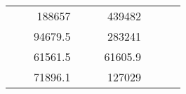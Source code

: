 \begin{table}[]
\begin{tabular}{|ccrccrccc}
\multicolumn{1}{|c|}{\cellcolor[HTML]{FFFFC7}}                                & \multicolumn{1}{c|}{\cellcolor[HTML]{DDFDFF}}                      & \multicolumn{1}{r|}{\cellcolor[HTML]{DAE8FC}188657}    & \multicolumn{1}{c|}{\cellcolor[HTML]{FFFFC7}}                                & \multicolumn{1}{c|}{\cellcolor[HTML]{DDFDFF}}                       & \multicolumn{1}{r|}{\cellcolor[HTML]{DDFDFF}439482}    &                                                                              &                                                                    &                                                        \\ \cline{3-3} \cline{6-6}
\multicolumn{1}{|c|}{\cellcolor[HTML]{FFFFC7}}                                & \multicolumn{1}{c|}{\cellcolor[HTML]{DDFDFF}}                      & \multicolumn{1}{r|}{\cellcolor[HTML]{DDFDFF}94679.5}   & \multicolumn{1}{c|}{\cellcolor[HTML]{FFFFC7}}                                & \multicolumn{1}{c|}{\cellcolor[HTML]{DDFDFF}}                       & \multicolumn{1}{r|}{\cellcolor[HTML]{DAE8FC}283241}    &                                                                              &                                                                    &                                                        \\ \cline{3-3} \cline{6-6}
\multicolumn{1}{|c|}{\cellcolor[HTML]{FFFFC7}}                                & \multicolumn{1}{c|}{\cellcolor[HTML]{DDFDFF}}                      & \multicolumn{1}{r|}{\cellcolor[HTML]{DAE8FC}61561.5}   & \multicolumn{1}{c|}{\cellcolor[HTML]{FFFFC7}}                                & \multicolumn{1}{c|}{\cellcolor[HTML]{DDFDFF}}                       & \multicolumn{1}{r|}{\cellcolor[HTML]{DDFDFF}61605.9}   &                                                                              &                                                                    &                                                        \\ \cline{3-3} \cline{6-6}
\multicolumn{1}{|c|}{\cellcolor[HTML]{FFFFC7}}                                & \multicolumn{1}{c|}{\cellcolor[HTML]{DDFDFF}}                      & \multicolumn{1}{r|}{\cellcolor[HTML]{DDFDFF}71896.1}   & \multicolumn{1}{c|}{\cellcolor[HTML]{FFFFC7}}                                & \multicolumn{1}{c|}{\cellcolor[HTML]{DDFDFF}}                       & \multicolumn{1}{r|}{\cellcolor[HTML]{DAE8FC}127029}    &                                                                              &                                                                    &                                                        \\ \cline{3-3} \cline{6-6}

\end{tabular}
\end{table}

